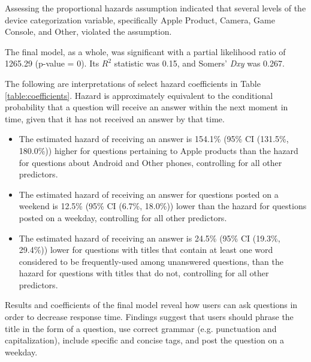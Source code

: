 \documentclass{article}
\begin{document}
Assessing the proportional hazards assumption indicated that several levels of the device categorization variable, specifically Apple Product, Camera, Game Console, and Other, violated the assumption. 

The final model, as a whole, was significant with a partial likelihood ratio of 1265.29 (p-value = 0). Its $R^2$ statistic was 0.15, and Somers' \textit{Dxy} was 0.267. 

The following are interpretations of select hazard coefficients in Table \ref{table:coefficients}. Hazard is approximately equivalent to the conditional probability that a question will receive an answer within the next moment in time, given that it has not received an answer by that time. 

\begin{itemize}
  \item The estimated hazard of receiving an answer is 154.1\% (95\% CI (131.5\%, 180.0\%)) higher for questions pertaining to Apple products than the hazard for questions about Android and Other phones, controlling for all other predictors.
  \item The estimated hazard of receiving an answer for questions posted on a weekend is 12.5\% (95\% CI (6.7\%, 18.0\%)) lower than the hazard for questions posted on a weekday, controlling for all other predictors.
  \item The estimated hazard of receiving an answer is 24.5\% (95\% CI (19.3\%, 29.4\%)) lower for questions with titles that contain at least one word considered to be frequently-used among unanswered questions, than the hazard for questions with titles that do not, controlling for all other predictors. 
\end{itemize}

Results and coefficients of the final model reveal how users can ask questions in order to decrease response time. Findings suggest that users should phrase the title in the form of a question, use correct grammar (e.g. punctuation and capitalization), include specific and concise tags, and post the question on a weekday. 
\end{document}
